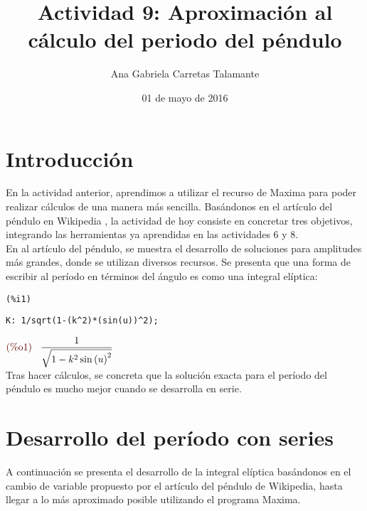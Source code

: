 \documentclass[12pt]{article}
\title{Actividad 9: Aproximación al cálculo del periodo del péndulo}
\author{Ana Gabriela Carretas Talamante}
\date{01 de mayo de 2016}
\begin{document}
\maketitle
\section{Introducción}
En la actividad anterior, aprendimos a utilizar el recurso de Maxima para poder realizar cálculos de una manera más sencilla. Basándonos en el artículo del péndulo en Wikipedia \cite{W}, la actividad de hoy consiste en concretar tres objetivos, integrando las herramientas ya aprendidas en las actividades 6 y 8. \\

En al artículo del péndulo, se muestra el desarrollo de soluciones para amplitudes más grandes, donde se utilizan diversos recursos. Se presenta que una forma de escribir al período en términos del ángulo es como una integral elíptica: \\
\noindent
\begin{minipage}[t]{8ex}{\color{red}\bf
\begin{verbatim}
(%i1) 
\end{verbatim}}
\end{minipage}
\begin{minipage}[t]{\textwidth}{\color{blue}
\begin{verbatim}
K: 1/sqrt(1-(k^2)*(sin(u))^2);
\end{verbatim}}
\end{minipage}
\begin{math}\displaystyle
\parbox{8ex}{\color{labelcolor}(\%o1) }
\frac{1}{\sqrt{1-{k}^{2}\,{\mathrm{sin}\left( u\right) }^{2}}}
\end{math} \\

Tras hacer cálculos, se concreta que la solución exacta para el período del péndulo es mucho mejor cuando se desarrolla en serie. 

\section{Desarrollo del período con series}
A continuación se presenta el desarrollo de la integral elíptica basándonos en el cambio de variable propuesto por el artículo del péndulo de Wikipedia, hasta llegar a lo más aproximado posible utilizando el programa Maxima. \\
\end{document}
